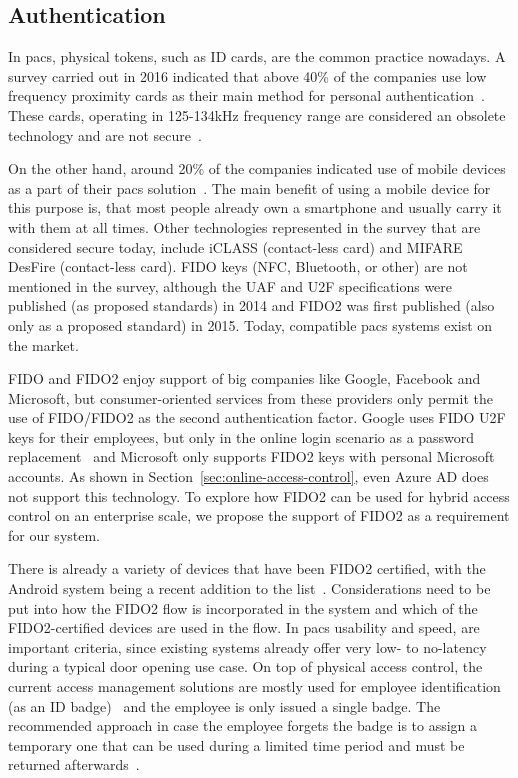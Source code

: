\subsection{Authentication}\label{sec:analysis-authentication}
In \acrshort{pacs}, physical tokens, such as ID cards, are the common practice nowadays. A survey carried out in 2016 indicated that above 40\% of the companies use low frequency proximity cards as their main method for personal authentication~\cite{HIDGlobal2017TheEnterprise}. These cards, operating in 125-134kHz frequency range are considered an obsolete technology and are not secure~\cite{Hakamaki2015SecurityTechnology}. 

On the other hand, around 20\% of the companies indicated use of mobile devices as a part of their \acrshort{pacs} solution~\cite{HIDGlobal2017TheEnterprise}. The main benefit of using a mobile device for this purpose is, that most people already own a smartphone and usually carry it with them at all times. Other technologies represented in the survey that are considered secure today, include iCLASS (contact-less card) and MIFARE DesFire (contact-less card). FIDO keys (NFC, Bluetooth, or other) are not mentioned in the survey, although the UAF and U2F specifications were published (as proposed standards) in 2014 and FIDO2 was first published (also only as a proposed standard) in 2015. Today, compatible \acrshort{pacs} systems exist on the market\footnotemark. 

FIDO and FIDO2 enjoy support of big companies like Google, Facebook and Microsoft, but consumer-oriented services from these providers only permit the use of FIDO/FIDO2 as the second authentication factor. Google uses FIDO U2F keys for their employees, but only in the online login scenario as a password replacement~\cite{Krebs2018Google:Phishing} and Microsoft only supports FIDO2 keys with personal Microsoft accounts. As shown in Section~\ref{sec:online-access-control}, even Azure AD does not support this technology. To explore how FIDO2 can be used for hybrid access control on an enterprise scale, we propose the support of FIDO2 as a requirement for our system.
% 

There is already a variety of devices that have been FIDO2 certified, with the Android system being a recent addition to the list~\cite{FIDOAlliance2019AndroidPasswords}. Considerations need to be put into how the FIDO2 flow is incorporated in the system and which of the FIDO2-certified devices are used in the flow. In \acrshort{pacs} usability and speed, are important criteria, since existing systems already offer very low- to no-latency during a typical door opening use case. On top of physical access control, the current access management solutions are mostly used for employee identification (as an ID badge)~\cite{HIDGlobal2017TheEnterprise} and the employee is only issued a single badge. The recommended approach in case the employee forgets the badge is to assign a temporary one that can be used during a limited time period and must be returned afterwards~\cite{Ryan2018HowBadges}.

